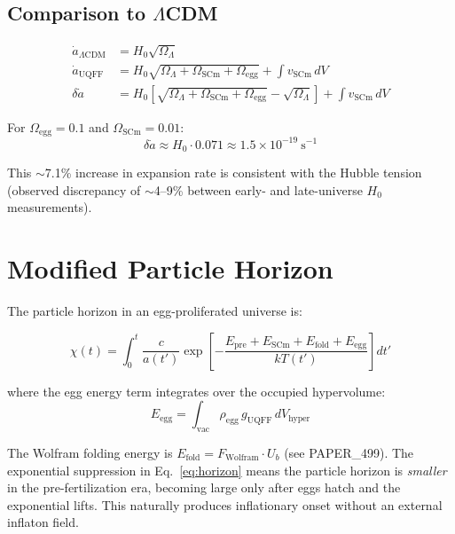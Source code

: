 \documentclass[12pt]{article}
\begin{document}
\subsection{Comparison to $\Lambda$CDM}

\begin{align}
    \dot{a}_{\Lambda\text{CDM}} &= H_0\sqrt{\Omega_\Lambda} \\
    \dot{a}_\text{UQFF} &= H_0\sqrt{\Omega_\Lambda + \Omega_\text{SCm}
                            + \Omega_\text{egg}} + \int v_\text{SCm}\,dV \\
    \delta\dot{a} &= H_0\!\left[\sqrt{\Omega_\Lambda + \Omega_\text{SCm}
                    + \Omega_\text{egg}} - \sqrt{\Omega_\Lambda}\right]
                    + \int v_\text{SCm}\,dV
\end{align}

For $\Omega_\text{egg} = 0.1$ and $\Omega_\text{SCm} = 0.01$:
\[
    \delta\dot{a} \approx H_0 \cdot 0.071 \approx 1.5 \times 10^{-19}\ \text{s}^{-1}
\]

This $\sim$7.1\% increase in expansion rate is consistent with the
Hubble tension (observed discrepancy of $\sim$4--9\% between early- and
late-universe $H_0$ measurements).

\section{Modified Particle Horizon}

The particle horizon in an egg-proliferated universe is:

\begin{equation}
    \chi(t) = \int_0^t \frac{c}{a(t')}
    \exp\!\left[-\frac{E_\text{pre} + E_\text{SCm} + E_\text{fold} + E_\text{egg}}{kT(t')}\right] dt'
    \label{eq:horizon}
\end{equation}

where the egg energy term integrates over the occupied hypervolume:
\begin{equation}
    E_\text{egg} = \int_\text{vac} \rho_\text{egg}\, g_\text{UQFF}\, dV_\text{hyper}
    \label{eq:E_egg}
\end{equation}

\noindent The Wolfram folding energy is $E_\text{fold} = F_\text{Wolfram} \cdot U_b$
(see PAPER\_499). The exponential suppression in Eq.~\eqref{eq:horizon} means
the particle horizon is \emph{smaller} in the pre-fertilization era, becoming
large only after eggs hatch and the exponential lifts. This naturally produces
inflationary onset without an external inflaton field.
\end{document}
